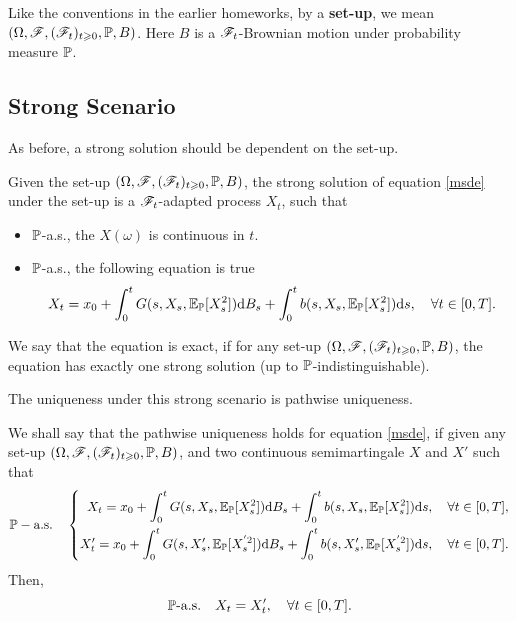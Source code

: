 \documentclass[8pt,onesided]{article}
\begin{document}
Like the conventions in the earlier homeworks, by a \textbf{set-up}, we mean $(\Omega,\mathscr{F},(\mathscr{F}_t)_{t\geqslant 0}, \mathbb{P},B)$. Here $B$ is a $\mathscr{F}_t$-Brownian motion under probability measure $\mathbb{P}$.

\subsection{Strong Scenario}

As before, a strong solution should be dependent on the set-up. 

\begin{definition}
     Given the set-up $(\Omega,\mathscr{F},(\mathscr{F}_t)_{t\geqslant 0}, \mathbb{P},B)$, the strong solution of equation \ref{msde} under the set-up is a $\mathscr{F}_t$-adapted process $X_t$, such that

    \begin{itemize}
        \item $\mathbb{P}$-a.s., the $X(\omega)$ is continuous in $t$.
        \item $\mathbb{P}$-a.s., the following equation is true
        \begin{equation*}
            X_t=x_0+\int_0^t G(s,X_s,\mathbb{E}_{\mathbb{P}}[X_s^2]) \dd B_s+\int_0^t b(s,X_s,\mathbb{E}_{\mathbb{P}}[X_s^2]) \dd s,\quad \forall t\in[0,T].
        \end{equation*}
    \end{itemize}

We say that the equation is exact, if for any set-up $(\Omega,\mathscr{F},(\mathscr{F}_t)_{t\geqslant 0}, \mathbb{P},B)$, the equation has exactly one strong solution (up to $\mathbb{P}$-indistinguishable).
\end{definition}

The uniqueness under this strong scenario is pathwise uniqueness.

\begin{definition}
     We shall say that the pathwise uniqueness holds for equation \ref{msde}, if given any set-up $(\Omega,\mathscr{F},(\mathscr{F}_t)_{t\geqslant 0}, \mathbb{P},B)$, and two continuous semimartingale $X$ and $X'$ such that
    \begin{equation*}
        \mathbb{P}-\text{a.s.}\quad\left\{
        \begin{aligned}
            X_t=x_0+\int_0^t G(s,X_s,\mathbb{E}_{\mathbb{P}}[X_s^2]) \dd B_s+\int_0^t b(s,X_s,\mathbb{E}_{\mathbb{P}}[X_s^2]) \dd s,\quad \forall t\in[0,T],\\
            X'_t=x_0+\int_0^t G(s,X'_s,\mathbb{E}_{\mathbb{P}}[X_s^{'2}]) \dd B_s+\int_0^t b(s,X'_s,\mathbb{E}_{\mathbb{P}}[X_s^{'2}]) \dd s,\quad \forall t\in[0,T].
        \end{aligned}
        \right.
    \end{equation*}
    Then, 
    \begin{equation*}
        \mathbb{P}\text{-a.s.} \quad X_t=X'_t, \quad \forall t\in [0,T].
    \end{equation*}
\end{definition}
\end{document}
